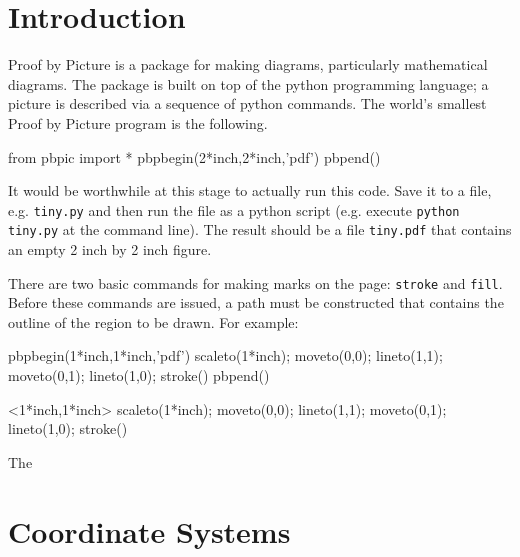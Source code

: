 \documentclass[12pt]{article}
\def\pbp{Proof by Picture }
\def\Python{python}
\def\cmd#1{{\tt #1}}
\begin{document}
\section{Introduction}
\pbp{} is a package for making diagrams, particularly
mathematical diagrams.  The package is built on top of the
\Python{} programming language; a picture is described via
a sequence of python commands.  The world's smallest
\pbp program is the following.
\begin{snippet}
from pbpic import *
pbpbegin(2*inch,2*inch,'pdf')
pbpend()
\end{snippet}
It would be worthwhile at this stage to actually run this code.
Save it to a file, e.g. \verb|tiny.py| and then run the file
as a python script (e.g. execute \verb|python tiny.py| at the command line).
The result should be a file \verb|tiny.pdf| that contains an empty 2 inch
by 2 inch figure.

There are two basic commands for making marks on the page:
\cmd{stroke} and \cmd{fill}.  Before these commands are issued,
a path must be constructed that contains the outline of the
region to be drawn.  For example:
\begin{snippet}
pbpbegin(1*inch,1*inch,'pdf')
scaleto(1*inch);
moveto(0,0); lineto(1,1);
moveto(0,1); lineto(1,0);
stroke()
pbpend()
\end{snippet}
\hfil\begin{pbpic}<1*inch,1*inch>
scaleto(1*inch);
moveto(0,0); lineto(1,1);
moveto(0,1); lineto(1,0);
stroke()  
\end{pbpic}

The 

% 
% 
% 

% 


\section{Coordinate Systems}
\end{document}
